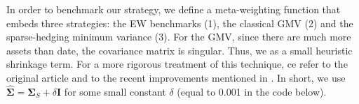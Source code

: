 \documentclass[]{krantz}
\makeatletter
\newenvironment{Shaded}{\begin{snugshade}}{\end{snugshade}}
\newcommand{\CommentTok}[1]{\textcolor[rgb]{0.37,0.37,0.37}{\textit{#1}}}
\newcommand{\ControlFlowTok}[1]{\textcolor[rgb]{0.27,0.27,0.27}{\textbf{#1}}}
\newcommand{\DataTypeTok}[1]{\textcolor[rgb]{0.27,0.27,0.27}{#1}}
\newcommand{\DecValTok}[1]{\textcolor[rgb]{0.06,0.06,0.06}{#1}}
\newcommand{\KeywordTok}[1]{\textcolor[rgb]{0.27,0.27,0.27}{\textbf{#1}}}
\newcommand{\NormalTok}[1]{#1}
\newcommand{\OperatorTok}[1]{\textcolor[rgb]{0.43,0.43,0.43}{\textbf{#1}}}
\newcommand{\StringTok}[1]{\textcolor[rgb]{0.5,0.5,0.5}{#1}}
\newenvironment{kframe}{%
\medskip{}
\setlength{\fboxsep}{.8em}
 \def\at@end@of@kframe{}%
 \ifinner\ifhmode%
  \def\at@end@of@kframe{\end{minipage}}%
  \begin{minipage}{\columnwidth}%
 \fi\fi%
 \def\FrameCommand##1{\hskip\@totalleftmargin \hskip-\fboxsep
 \colorbox{shadecolor}{##1}\hskip-\fboxsep
     \hskip-\linewidth \hskip-\@totalleftmargin \hskip\columnwidth}%
 \MakeFramed {\advance\hsize-\width
   \@totalleftmargin\z@ \linewidth\hsize
   \@setminipage}}%
 {\par\unskip\endMakeFramed%
 \at@end@of@kframe}
\renewenvironment{Shaded}{\begin{kframe}}{\end{kframe}}
\theoremstyle{definition}
\theoremstyle{definition}
\theoremstyle{definition}
\theoremstyle{remark}
\makeatother
\begin{document}
\begin{Shaded}
\end{Shaded}

\normalsize

In order to benchmark our strategy, we define a meta-weighting function
that embeds three strategies: the EW benchmarks (1), the classical GMV
(2) and the sparse-hedging minimum variance (3). For the GMV, since
there are much more assets than date, the covariance matrix is singular.
Thus, we as a small heuristic shrinkage term. For a more rigorous
treatment of this technique, ce refer to the original article
\citet{ledoit2004well} and to the recent improvements mentioned in
\citet{ledoit2017nonlinear}. In short, we use
\(\hat{\boldsymbol{\Sigma}}=\boldsymbol{\Sigma}_S+\delta \boldsymbol{I}\)
for some small constant \(\delta\) (equal to 0.001 in the code below).
\end{document}
